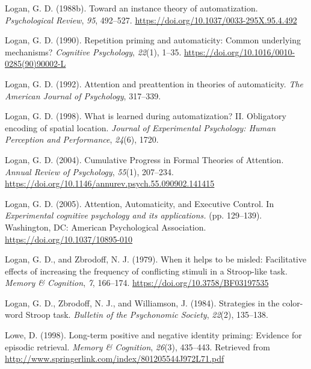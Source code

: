 \documentclass[]{DissertateCUNY}
\begin{document}
\leavevmode\hypertarget{ref-logan_toward_1988}{}%
Logan, G. D. (1988b). Toward an instance theory of automatization.
\emph{Psychological Review}, \emph{95}, 492--527.
\url{https://doi.org/10.1037/0033-295X.95.4.492}

\leavevmode\hypertarget{ref-logan_repetition_1990}{}%
Logan, G. D. (1990). Repetition priming and automaticity: Common
underlying mechanisms? \emph{Cognitive Psychology}, \emph{22}(1), 1--35.
\url{https://doi.org/10.1016/0010-0285(90)90002-L}

\leavevmode\hypertarget{ref-logan_attention_1992}{}%
Logan, G. D. (1992). Attention and preattention in theories of
automaticity. \emph{The American Journal of Psychology}, 317--339.

\leavevmode\hypertarget{ref-logan_what_1998}{}%
Logan, G. D. (1998). What is learned during automatization? II.
Obligatory encoding of spatial location. \emph{Journal of Experimental
Psychology: Human Perception and Performance}, \emph{24}(6), 1720.

\leavevmode\hypertarget{ref-logan_cumulative_2004}{}%
Logan, G. D. (2004). Cumulative Progress in Formal Theories of
Attention. \emph{Annual Review of Psychology}, \emph{55}(1), 207--234.
\url{https://doi.org/10.1146/annurev.psych.55.090902.141415}

\leavevmode\hypertarget{ref-logan_attention_2005}{}%
Logan, G. D. (2005). Attention, Automaticity, and Executive Control. In
\emph{Experimental cognitive psychology and its applications.} (pp.
129--139). Washington, DC: American Psychological Association.
\url{https://doi.org/10.1037/10895-010}

\leavevmode\hypertarget{ref-logan_when_1979}{}%
Logan, G. D., and Zbrodoff, N. J. (1979). When it helps to be misled:
Facilitative effects of increasing the frequency of conflicting stimuli
in a Stroop-like task. \emph{Memory \& Cognition}, \emph{7}, 166--174.
\url{https://doi.org/10.3758/BF03197535}

\leavevmode\hypertarget{ref-logan_strategies_1984}{}%
Logan, G. D., Zbrodoff, N. J., and Williamson, J. (1984). Strategies in
the color-word Stroop task. \emph{Bulletin of the Psychonomic Society},
\emph{22}(2), 135--138.

\leavevmode\hypertarget{ref-lowe_long-term_1998}{}%
Lowe, D. (1998). Long-term positive and negative identity priming:
Evidence for episodic retrieval. \emph{Memory \& Cognition},
\emph{26}(3), 435--443. Retrieved from
\url{http://www.springerlink.com/index/801205544J972L71.pdf}
\end{document}
